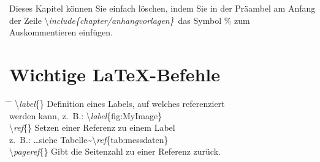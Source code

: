 \setcounter{chapter}{6}
\setcounter{section}{0}
\setcounter{table}{0}
\setcounter{figure}{0}

Dieses Kapitel können Sie einfach löschen, indem Sie in der Präambel am Anfang der Zeile \glqq \textbackslash\textit{include\{chapter/anhang\lowrule vorlagen\}}\grqq~das Symbol \% zum Auskommentieren einfügen.

\section{Wichtige \LaTeX -Befehle}

\begin{tabbing}
\hspace*{0cm} \= \hspace{0.42\linewidth} \= \+\kill
\textbackslash \textit{label}\{\}	\> Definition eines Labels, auf welches referenziert \\ 
	\> werden kann, z.~B.: \textbackslash \textit{label}\{fig:MyImage\}\\ 
\textbackslash \textit{ref}\{\}	\> Setzen einer Referenz zu einem Label\\
\> z.~B.: \ldots siehe Tabelle\~{}\textbackslash \textit{ref}\{tab:messdaten\}\\ 
\textbackslash \textit{pageref}\{\}	\> Gibt die Seitenzahl zu einer Referenz zurück.\\


\end{tabbing}
